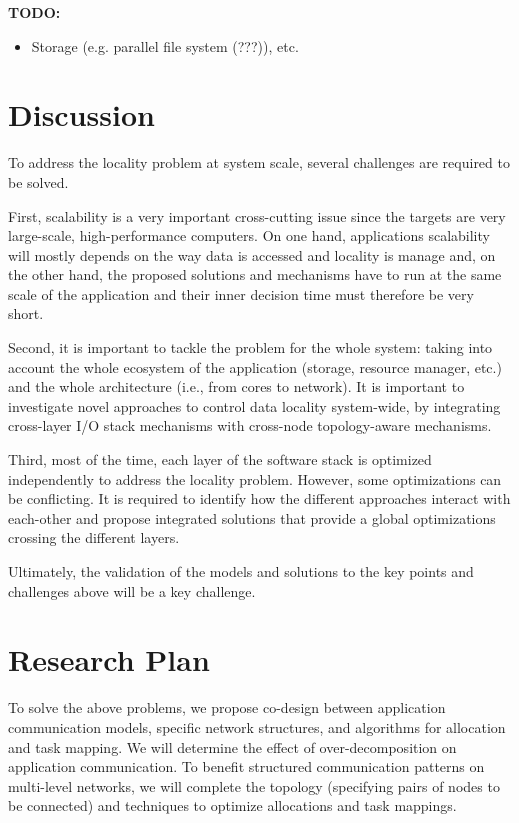 {\bf TODO:}  
\begin{itemize}
\item Storage (e.g. parallel file system (???)), etc. 
\end{itemize}

\section{Discussion}
To address the locality problem at system scale, several challenges are required
to be solved. 

First, scalability is a very important cross-cutting issue since the targets are
very large-scale, high-performance computers. On one hand, applications
scalability will mostly depends on the way data is accessed and locality is
manage and, on the other hand, the proposed solutions and mechanisms have to run
at the same scale of the application and their inner decision time must
therefore be very short.

Second, it is important to tackle the problem for the whole system: taking into account
the whole ecosystem of the application (storage, resource manager, etc.) and the
whole architecture (i.e., from cores to network). It is important to investigate
novel approaches to control data locality system-wide, by integrating
cross-layer I/O stack mechanisms  with cross-node topology-aware mechanisms. 

Third, most of the time, each layer of the software stack is optimized
independently to address the locality problem. However, some optimizations can
be conflicting. It is required to identify how the different approaches interact
with each-other and propose integrated solutions that provide a global
optimizations crossing the different layers.

Ultimately, the validation of the models and solutions to the key points and challenges above 
will be a key challenge.

\section{Research Plan}

To solve the above problems, we propose co-design between application 
communication models, specific network structures, and algorithms for 
allocation and task mapping.
We will determine the effect of over-decomposition on application 
communication.
To benefit structured communication patterns on multi-level networks, we will 
complete the topology (specifying pairs of nodes to be connected) and 
techniques to optimize allocations and task mappings.
